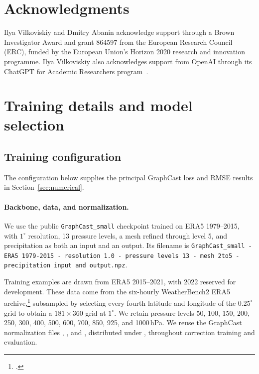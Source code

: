 \documentclass[11pt]{article}
\begin{document}
\section*{{Acknowledgments}}
{Ilya Vilkoviskiy and Dmitry Abanin acknowledge support through a Brown Investigator Award and grant 864597 from the European Research Council (ERC), funded by the European Union's Horizon 2020 research and innovation programme. Ilya Vilkoviskiy also acknowledges support from OpenAI through its ChatGPT for Academic Researchers program~\citep{openai2026academicresearchers}.}




\clearpage
\appendix

\section{\texorpdfstring{{Training details and model selection}}{Training details and model selection}}
\label{app:training}

\subsection{Training configuration}
\label{app:training_configuration}
The configuration below supplies the principal {GraphCast loss} and RMSE results in Section~\ref{sec:numerical}.

\paragraph{Backbone, data, and normalization.}
We use the public \texttt{GraphCast\_small} checkpoint trained on ERA5 1979--2015, with $1^\circ$ resolution, 13 pressure levels, a mesh refined through level 5, and precipitation as both an input and an output. Its filename is {\small\texttt{GraphCast\_small - ERA5 1979-2015 - resolution 1.0 - pressure levels 13 - mesh 2to5 - precipitation input and output.npz}}.

Training examples are drawn from ERA5 2015--2021, with 2022 reserved for development. These data come from the six-hourly WeatherBench2 ERA5 archive,\footnote{.} subsampled by selecting every fourth latitude and longitude of the $0.25^\circ$ grid to obtain a $181\times360$ grid at $1^\circ$. We retain pressure levels 50, 100, 150, 200, 250, 300, 400, 500, 600, 700, 850, 925, and 1000\,hPa. We reuse the GraphCast normalization files , , and , distributed under , throughout correction training and evaluation.
\end{document}
